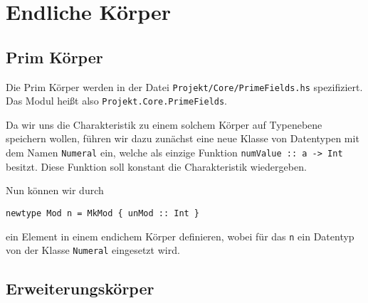 \section{Endliche Körper}
\subsection{Prim Körper}
Die Prim Körper werden in der Datei \texttt{Projekt/Core/PrimeFields.hs}
spezifiziert. Das Modul heißt also \texttt{Projekt.Core.PrimeFields}.

Da wir uns die Charakteristik zu einem solchem Körper auf Typenebene speichern
wollen, führen wir dazu zunächst eine neue Klasse von Datentypen mit dem Namen
\texttt{Numeral} ein, welche als einzige Funktion \texttt{numValue  :: a ->
Int} besitzt. Diese Funktion soll konstant die Charakteristik wiedergeben.

Nun können wir durch
\begin{lstlisting}
newtype Mod n = MkMod { unMod :: Int }
\end{lstlisting}
ein Element in einem endichem Körper definieren, wobei für das \texttt{n} ein
Datentyp von der Klasse \texttt{Numeral} eingesetzt wird.


\subsection{Erweiterungskörper}

